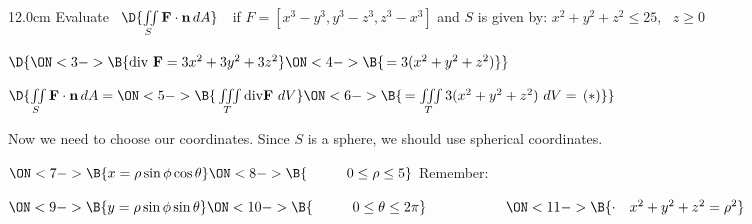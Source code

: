 \begin{frame}
\begin{columns}\begin{column}{12.0cm}
\scriptsize
\EX Evaluate \, $\D{\iint \limits_{S} {\bf F} \cdot {\bf n} \, dA}$	\,\, if $F = [x^3-y^3,y^3-z^3,z^3-x^3]$ and $S$ is given by: $x^2 + y^2 + z^2 \le 25$, \, $z \ge 0$

\vspace{0.1cm}


\vspace{0.2cm}

$\D{
\ON<3->{\B{\text{div } {\bf F} = 3x^2 + 3y^2 + 3z^2}}
\ON<4->{\B{\, = 3(x^2 + y^2 + z^2)}}}$

\vspace{0.2cm}

$\D{\iint \limits_{S} {\bf F} \cdot {\bf n}\, dA = 
\ON<5->{\B{\,\iiint \limits_{T} \text{div} {\bf F} \,\, dV}}
\ON<6->{\B{\,  = \iiint \limits_{T} 3(x^2 + y^2 + z^2) \,\, dV = \, (*)}}
}$

\vspace{0.2cm}

Now we need to choose our coordinates.  Since $S$ is a sphere, we should use spherical coordinates.

\vspace{0.2cm}

$\ON<7->{\B{x = \rho \sin \phi \cos \theta}}
\ON<8->{\B{ \hspace{1.0cm} 0 \le \rho \le 5}} $ \hspace{1.8cm} Remember:
	
\vspace{0.1cm}
	
$\ON<9->{\B{y = \rho \sin \phi \sin \theta}}
\ON<10->{\B{ \hspace{1.0cm} 0 \le \theta \le 2\pi}} \hspace{2.0cm} 
\ON<11->{\B{\cdot \quad x^2+y^2+z^2 = \rho^2}}$	
	
\vspace{0.1cm}
	

\end{column}
\end{columns}
\end{frame}

